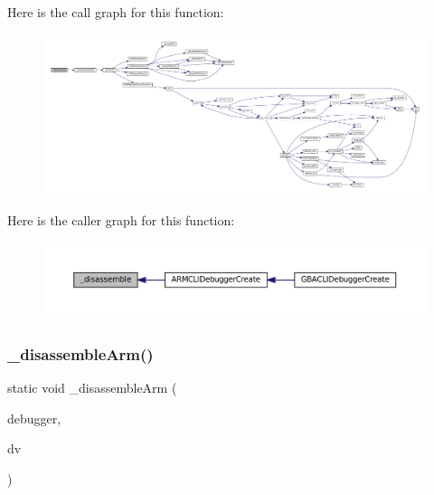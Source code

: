 Here is the call graph for this function\+:
\nopagebreak
\begin{figure}[H]
\begin{center}
\leavevmode
\includegraphics[width=350pt]{arm_2debugger_2cli-debugger_8c_ab744a20db75c627a6cf552eee9339cc0_cgraph}
\end{center}
\end{figure}
Here is the caller graph for this function\+:
\nopagebreak
\begin{figure}[H]
\begin{center}
\leavevmode
\includegraphics[width=350pt]{arm_2debugger_2cli-debugger_8c_ab744a20db75c627a6cf552eee9339cc0_icgraph}
\end{center}
\end{figure}
\mbox{\label{arm_2debugger_2cli-debugger_8c_ab0bbaa1e92b7c34f955f91a60e2bce71}} 
\subsubsection{\texorpdfstring{\+\_\+disassemble\+Arm()}{\_disassembleArm()}}
{\footnotesize\ttfamily static void \+\_\+disassemble\+Arm (\begin{DoxyParamCaption}\item[{struct C\+L\+I\+Debugger $\ast$}]{debugger,  }\item[{struct C\+L\+I\+Debug\+Vector $\ast$}]{dv }\end{DoxyParamCaption})\hspace{0.3cm}{\ttfamily [static]}}

